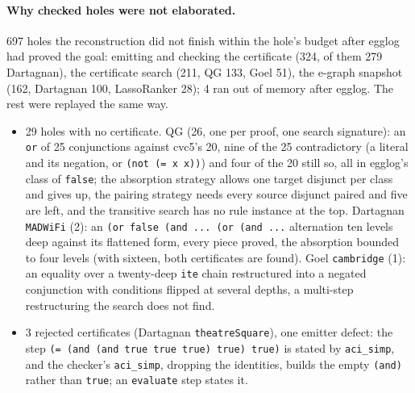 \documentclass[11pt,a4paper]{article}
\newcommand{\code}[1]{\texttt{#1}}
\begin{document}
\paragraph{Why checked holes were not elaborated.} 697 holes the
reconstruction did not finish within the hole's budget after egglog had
proved the goal: emitting and checking the certificate (324, of them 279
Dartagnan), the certificate search (211, QG 133, Goel 51), the e-graph
snapshot (162, Dartagnan 100, LassoRanker 28); 4 ran out of memory after
egglog. The rest were replayed the same way.
\begin{itemize}
  \item 29 holes with no certificate. QG (26, one per proof, one search
    signature): an \code{or} of 25 conjunctions against cvc5's 20, nine of
    the 25 contradictory (a literal and its negation, or
    \code{(not (= x x))}) and four of the 20 still so, all in egglog's
    class of \code{false}; the absorption strategy allows one target
    disjunct per class and gives up, the pairing strategy needs every
    source disjunct paired and five are left, and the transitive search has
    no rule instance at the top. Dartagnan \code{MADWiFi} (2): an
    \code{(or false (and ... (or (and ...} alternation ten levels deep
    against its flattened form, every piece proved, the absorption bounded
    to four levels (with sixteen, both certificates are found). Goel
    \code{cambridge} (1): an equality over a twenty-deep \code{ite} chain
    restructured into a negated conjunction with conditions flipped at
    several depths, a multi-step restructuring the search does not find.
  \item 3 rejected certificates (Dartagnan \code{theatreSquare}), one
    emitter defect: the step \code{(= (and (and true true true) true)
    true)} is stated by \code{aci\_simp}, and the checker's
    \code{aci\_simp}, dropping the identities, builds the empty
    \code{(and)} rather than \code{true}; an \code{evaluate} step states it.
\end{itemize}

\appendix
\end{document}
